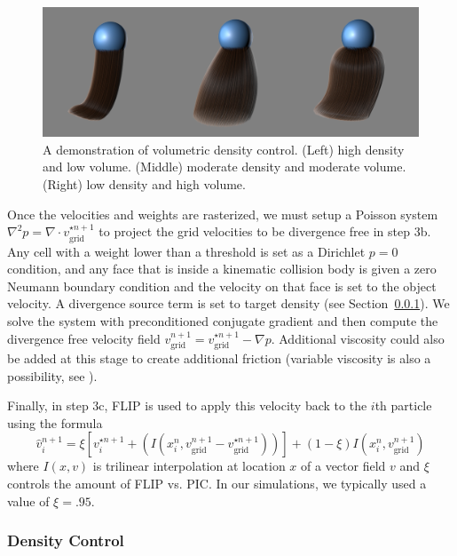 \begin{figure}[t]
  \centering
\includegraphics[width=.99\linewidth]{hair/images/density/density-figure}
  \caption{\label{fig:density} A demonstration of volumetric density
    control. (Left) high density and low volume. (Middle) moderate density and
    moderate volume. (Right) low density and high volume.}
\end{figure}

Once the velocities and weights are rasterized, we must setup a
Poisson system $\nabla^2p=\nabla \cdot v_\textrm{grid}^{\star n+1}$ to
project the grid velocities to be divergence free in step 3b. Any cell
with a weight lower than a threshold is set as a Dirichlet $p=0$
condition, and any face that is inside a kinematic collision body is
given a zero Neumann boundary condition and the velocity on that face is set to
the object velocity. A divergence source term is set to target density
(see Section~\ref{sec:density}). We solve the system with
preconditioned conjugate gradient and then compute the divergence free
velocity field $v^{n+1}_\textrm{grid}=v_\textrm{grid}^{\star
  n+1}-\nabla p$. Additional viscosity could also be added at this stage to
create additional friction (variable viscosity is also a
possibility, see \cite{Carlson:2002:MAF,rasmussen:2004:t3}).

Finally, in step 3c, FLIP is used to apply this velocity back to the $i$th
particle using the formula
$$\hat{v}_i^{n+1} =\xi \left[v_i^{\star n+1} +
(I(x_i^n,v_\textrm{grid}^{n+1}-v^{\star n+1}_\textrm{grid}))\right] +(1-
\xi)  I(x_i^n,v_\textrm{grid}^{n+1})$$ where $I(x,v)$ is trilinear
interpolation at location $x$ of a vector field $v$ and $\xi$
controls the amount of FLIP vs. PIC.  In our simulations, we typically
used a value of $\xi=.95$.

\vspace{-5pt}
\subsubsection{Density Control}
\label{sec:density}
\vspace{-5pt}

